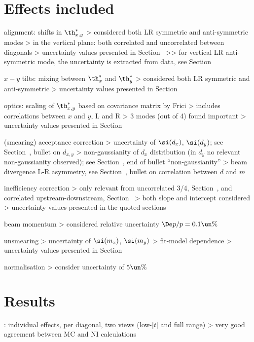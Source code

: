 \section[systematics-effects]{Effects included}

\> alignment: shifts in $\th^*_{x,y}$
\>> considered both LR symmetric and anti-symmetric modes
\>> in the vertical plane: both correlated and uncorrelated between diagonals
\>> uncertainty values presented in Section~
\>>> for vertical LR anti-symmetric mode, the uncertainty is extracted from data, see Section~

\> $x-y$ tilts: mixing between $\th^*_{x}$ and $\th^*_{y}$
\>> considered both LR symmetric and anti-symmetric
\>> uncertainty values presented in Section~

\> optics: scaling of $\th^*_{x,y}$ based on covariance matrix by Frici
\>> includes correlations between $x$ and $y$, L and R
\>> 3 modes (out of 4) found important
\>> uncertainty values presented in Section~

\> (smearing) acceptance correction
\>> uncertainty of $\si(d_x)$, $\si(d_y)$; see Section~, bullet on $d_{x,y}$
\>> non-gaussianity of $d_x$ distribution (in $d_y$ no relevant non-gaussianity observed); see Section~, end of bullet ``non-gaussianity''
\>> beam divergence L-R asymmetry, see Section~, bullet on correlation between $d$ and $m$

\> inefficiency correction
\>> only relevant from uncorrelated 3/4, Section~, and correlated upstream-downstream, Section~
\>> both slope and intercept considered
\>> uncertainty values presented in the quoted sections

\> beam momentum
\>> considered relative uncertainty $\De p/p = 0.1\un{\%}$

\> unsmearing
\>> uncertainty of $\si(m_x)$, $\si(m_y)$
\>> fit-model dependence
\>> uncertainty values presented in Section~

\> normalisation
\>> consider uncertainty of $5\un{\%}$


\section[systematics-results]{Results}

\>  : individual effects, per diagonal, two views (low-$|t|$ and full range)
\>> very good agreement between MC and NI calculations

